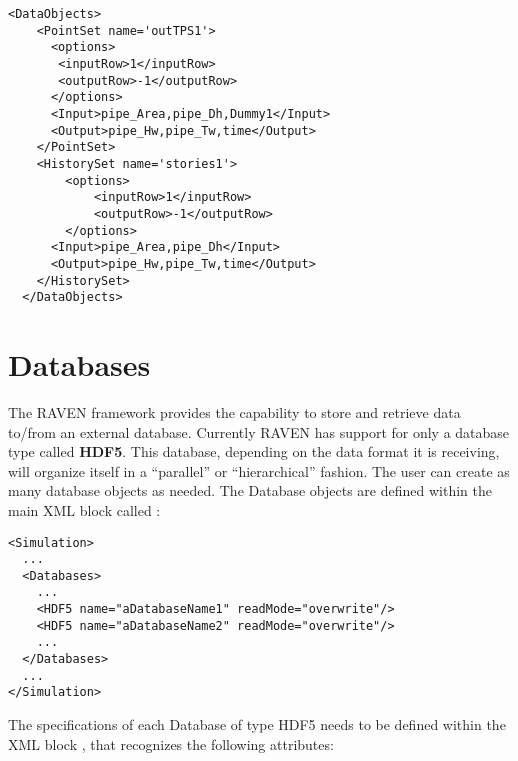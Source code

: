 \begin{lstlisting}[style=XML,morekeywords={inputTs,operator,hierarchical,name,history}]
  <DataObjects>
    <PointSet name='outTPS1'>
      <options>
       <inputRow>1</inputRow>
       <outputRow>-1</outputRow>
      </options>
      <Input>pipe_Area,pipe_Dh,Dummy1</Input>
      <Output>pipe_Hw,pipe_Tw,time</Output>
    </PointSet>
    <HistorySet name='stories1'>
        <options>
            <inputRow>1</inputRow>
            <outputRow>-1</outputRow>
        </options>
      <Input>pipe_Area,pipe_Dh</Input>
      <Output>pipe_Hw,pipe_Tw,time</Output>
    </HistorySet>
  </DataObjects>
\end{lstlisting}

\section{Databases}
\label{sec:Databases}
The RAVEN framework provides the capability to store and retrieve data to/from
an external database.
%
Currently RAVEN has support for only a database type called \textbf{HDF5}.
%
This database, depending on the data format it is receiving, will organize
itself in a ``parallel'' or ``hierarchical'' fashion.
%
The user can create as many database objects as needed.
%
The Database objects are defined within the main XML block called
:
\begin{lstlisting}[style=XML]
<Simulation>
  ...
  <Databases>
    ...
    <HDF5 name="aDatabaseName1" readMode="overwrite"/>
    <HDF5 name="aDatabaseName2" readMode="overwrite"/>
    ...
  </Databases>
  ...
</Simulation>
\end{lstlisting}
The specifications of each Database of type HDF5 needs to be defined within the
XML block , that recognizes the following attributes:
\vspace{-5mm}
